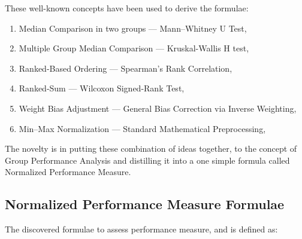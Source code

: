 \documentclass[a4paper,fleqn,review]{cas-sc}
\newcommand{\ldash}{--- }
\begin{document}
These well-known concepts have been used to derive the formulae:
\begin{enumerate}[i]
\item Median Comparison in two groups \ldash Mann–Whitney U Test, \cite{mann1947test}
\item Multiple Group Median Comparison \ldash Kruskal-Wallis H test, \cite{kruskal1952use}
\item Ranked-Based Ordering \ldash Spearman’s Rank Correlation, \cite{spearman1904proof}
\item Ranked-Sum \ldash Wilcoxon Signed-Rank Test, \cite{wilcoxon1945individual}
\item Weight Bias Adjustment \ldash General Bias Correction via Inverse Weighting, \cite{gelman2007survey}
\item Min–Max Normalization \ldash Standard Mathematical Preprocessing, \cite{han2011data}
\end{enumerate}
The novelty is in putting these combination of ideas together, to the concept of Group Performance Analysis and distilling it into a one simple formula called Normalized Performance Measure.

\subsection{Normalized Performance Measure Formulae} 
The discovered formulae to assess performance measure, and is defined as:
\end{document}
